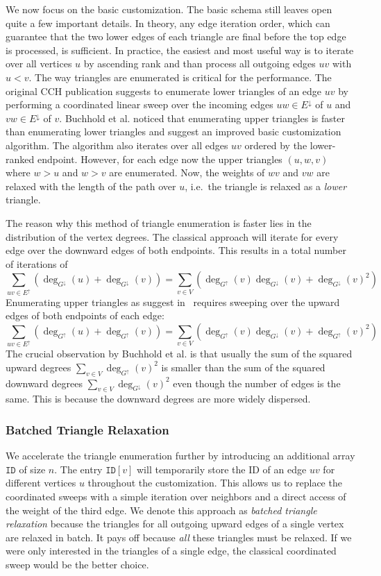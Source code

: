 \documentclass[a4paper, english, cleveref]{lipics-v2021}
\newcommand*{\gchu}{G^{\uparrow}}
\newcommand*{\gchd}{G^{\downarrow}}
\newcommand*{\echu}{E^{\uparrow}}
\newcommand*{\echd}{E^{\downarrow}}
\begin{document}
We now focus on the basic customization. %
The basic schema still leaves open quite a few important details.
In theory, any edge iteration order, which can guarantee that the two lower edges of each triangle are final before the top edge is processed, is sufficient.
In practice, the easiest and most useful way is to iterate over all vertices $u$ by ascending rank and than process all outgoing edges $uv$ with $u < v$.
The way triangles are enumerated is critical for the performance.
The original CCH publication suggests to enumerate lower triangles of an edge $uv$ by performing a coordinated linear sweep over the incoming edges $uw \in \echd$ of $u$ and $vw \in \echd$ of $v$.
Buchhold et al. noticed that enumerating upper triangles is faster than enumerating lower triangles and suggest an improved basic customization algorithm.
The algorithm also iterates over all edges $uv$ ordered by the lower-ranked endpoint.
However, for each edge now the upper triangles $(u,w,v)$ where $w>u$ and $w>v$ are enumerated.
Now, the weights of $wv$ and $vw$ are relaxed with the length of the path over $u$, i.e.\ the triangle is relaxed as a \emph{lower} triangle.

The reason why this method of triangle enumeration is faster lies in the distribution of the vertex degrees.
The classical approach will iterate for every edge over the downward edges of both endpoints.
This results in a total number of iterations of
\[
\sum_{uv \in \echu} \left( \deg_{\gchd}(u) + \deg_{\gchd}(v) \right) = \sum_{v \in V}\left( \deg_{\gchu}(v)\deg_{\gchd}(v) + \deg_{\gchd}(v)^2 \right)
\]
Enumerating upper triangles as suggest in~\cite{BuchholdSW19} requires sweeping over the upward edges of both endpoints of each edge:
\[
\sum_{uv \in \echu} \left( \deg_{\gchu}(u) + \deg_{\gchu}(v) \right) = \sum_{v \in V}( \deg_{\gchu}(v)\deg_{\gchd}(v) + \deg_{\gchu}(v)^2 )
\]
The crucial observation by Buchhold et al. is that usually  the sum of the squared upward degrees $\sum_{v \in V} \deg_{\gchu}(v)^2$ is smaller than the sum of the squared downward degrees $\sum_{v \in V} \deg_{\gchd}(v)^2$ even though the number of edges is the same.
This is because the downward degrees are more widely dispersed.

\subsubsection{Batched Triangle Relaxation}

We accelerate the triangle enumeration further by introducing an additional array $\mathtt{ID}$ of size $n$.
The entry $\mathtt{ID}[v]$ will temporarily store the ID of an edge $uv$ for different vertices $u$ throughout the customization. %
This allows us to replace the coordinated sweeps with a simple iteration over neighbors and a direct access of the weight of the third edge.
We denote this approach as \emph{batched triangle relaxation} because the triangles for all outgoing upward edges of a single vertex are relaxed in batch.
It pays off because \emph{all} these triangles must be relaxed.
If we were only interested in the triangles of a single edge, the classical coordinated sweep would be the better choice.
\end{document}
